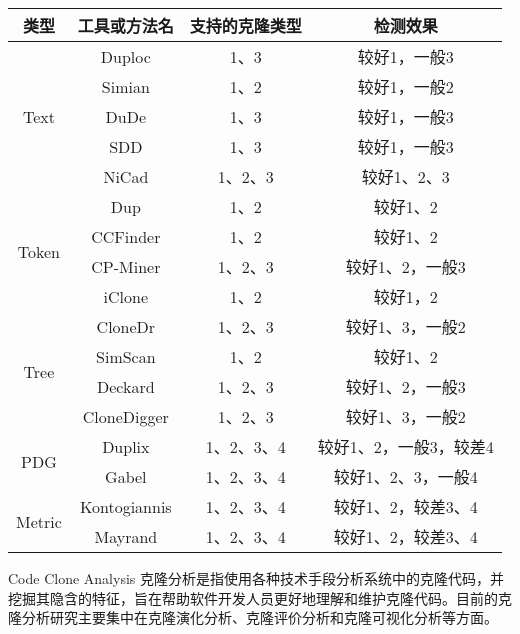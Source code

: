 \begin{table}[htbp]
\vspace{0.5em}\centering\wuhao
\begin{tabular}{cccc}
\toprule[1.5pt]
类型&工具或方法名&支持的克隆类型&检测效果\\
\midrule[1pt]
\multirow{5}{*}{Text} 
& Duploc\cite{ducasse1999language}&1、3&较好1，一般3\\
&Simian\cite{Simian}&1、2	&较好1，一般2\\
&DuDe\cite{wettel2005archeology}&1、3	&较好1，一般3\\
&SDD\cite{lee2005sdd}&1、3	&较好1，一般3\\
&NiCad\cite{roy2008nicad}&	1、2、3	&较好1、2、3\\
\midrule[1pt]
\multirow{4}{*}{Token} 
&Dup\cite{baker1995finding}&	1、2&较好1、2\\
&CCFinder\cite{kamiya2002ccfinder}&1、2&较好1、2\\
&CP-Miner\cite{li2006cp}&1、2、3&较好1、2，一般3\\
&iClone\cite{gode2009incremental}&1、2	&较好1，2\\
\midrule[1pt]
\multirow{4}{*}{Tree} 
&CloneDr\cite{baxter1998clone}&	1、2、3	&较好1、3，一般2\\
&SimScan\cite{SimScan}&	1、2	&较好1、2\\
&Deckard\cite{jiang2007deckard}&	1、2、3	&较好1、2，一般3\\
&CloneDigger\cite{bulychev2008duplicate}&	1、2、3	&较好1、3，一般2\\
\midrule[1pt]
\multirow{2}{*}{PDG} 
&Duplix\cite{krinke2001identifying}&	1、2、3、4	&较好1、2，一般3，较差4\\
&Gabel\cite{gabel2008scalable}&1、2、3、4	&较好1、2、3，一般4\\
\midrule[1pt]
\multirow{2}{*}{Metric} 
&Kontogiannis\cite{kontogiannis1996pattern}&	1、2、3、4	&较好1、2，较差3、4\\
&Mayrand\cite{mayrand1996experiment}&	1、2、3、4	&较好1、2，较差3、4\\
\bottomrule[1.5pt]
\end{tabular}
\end{table}

{Code Clone Analysis}
克隆分析是指使用各种技术手段分析系统中的克隆代码，并挖掘其隐含的特征，旨在帮助软件开发人员更好地理解和维护克隆代码。目前的克隆分析研究主要集中在克隆演化分析、克隆评价分析和克隆可视化分析等方面。

